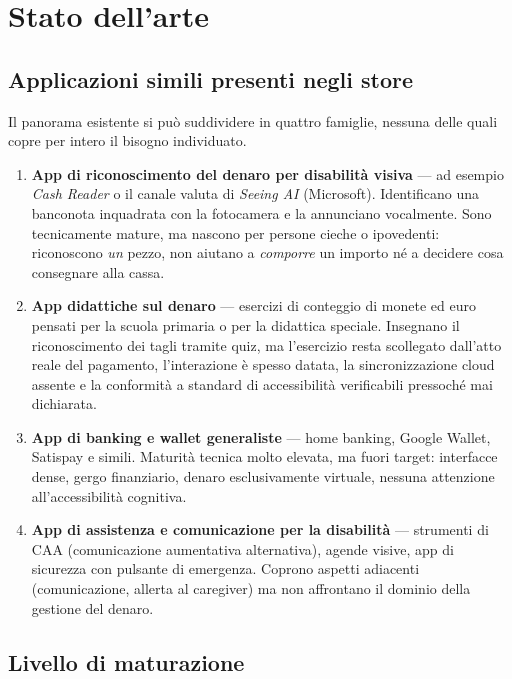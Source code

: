 \documentclass[11pt,a4paper]{article}
\begin{document}
\section{Stato dell'arte}

\subsection{Applicazioni simili presenti negli store}

Il panorama esistente si pu\`o suddividere in quattro famiglie, nessuna delle quali copre per
intero il bisogno individuato.

\begin{enumerate}[leftmargin=1.4cm]
  \item \textbf{App di riconoscimento del denaro per disabilit\`a visiva} --- ad esempio
  \emph{Cash Reader} o il canale valuta di \emph{Seeing AI} (Microsoft). Identificano una
  banconota inquadrata con la fotocamera e la annunciano vocalmente. Sono tecnicamente mature, ma
  nascono per persone cieche o ipovedenti: riconoscono \emph{un} pezzo, non aiutano a
  \emph{comporre} un importo n\'e a decidere cosa consegnare alla cassa.
  \item \textbf{App didattiche sul denaro} --- esercizi di conteggio di monete ed euro pensati
  per la scuola primaria o per la didattica speciale. Insegnano il riconoscimento dei tagli
  tramite quiz, ma l'esercizio resta scollegato dall'atto reale del pagamento, l'interazione \`e
  spesso datata, la sincronizzazione cloud assente e la conformit\`a a standard di accessibilit\`a
  verificabili pressoch\'e mai dichiarata.
  \item \textbf{App di banking e wallet generaliste} --- home banking, Google Wallet, Satispay e
  simili. Maturit\`a tecnica molto elevata, ma fuori target: interfacce dense, gergo finanziario,
  denaro esclusivamente virtuale, nessuna attenzione all'accessibilit\`a cognitiva.
  \item \textbf{App di assistenza e comunicazione per la disabilit\`a} --- strumenti di CAA
  (comunicazione aumentativa alternativa), agende visive, app di sicurezza con pulsante di
  emergenza. Coprono aspetti adiacenti (comunicazione, allerta al caregiver) ma non affrontano il
  dominio della gestione del denaro.
\end{enumerate}

\subsection{Livello di maturazione}
\end{document}
